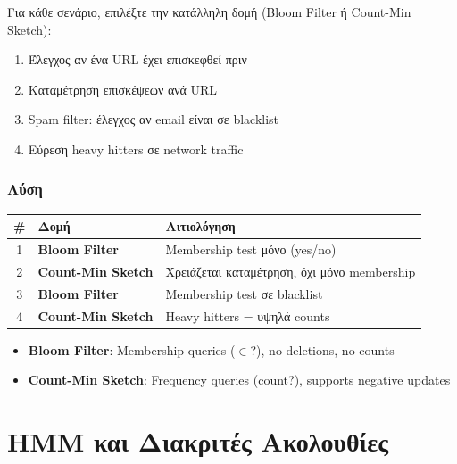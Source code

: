 \begin{formulabox}[Εκφώνηση]
Για κάθε σενάριο, επιλέξτε την κατάλληλη δομή (Bloom Filter ή Count-Min Sketch):

\begin{enumerate}
    \item Έλεγχος αν ένα URL έχει επισκεφθεί πριν
    \item Καταμέτρηση επισκέψεων ανά URL
    \item Spam filter: έλεγχος αν email είναι σε blacklist
    \item Εύρεση heavy hitters σε network traffic
\end{enumerate}
\end{formulabox}

\subsubsection*{Λύση}

\begin{center}
\begin{tabular}{clp{6cm}}
\toprule
\textbf{\#} & \textbf{Δομή} & \textbf{Αιτιολόγηση} \\
\midrule
1 & \textbf{Bloom Filter} & Membership test μόνο (yes/no) \\
2 & \textbf{Count-Min Sketch} & Χρειάζεται καταμέτρηση, όχι μόνο membership \\
3 & \textbf{Bloom Filter} & Membership test σε blacklist \\
4 & \textbf{Count-Min Sketch} & Heavy hitters = υψηλά counts \\
\bottomrule
\end{tabular}
\end{center}

\begin{infobox}[Σύγκριση]
\begin{itemize}
    \item \textbf{Bloom Filter}: Membership queries ($\in$?), no deletions, no counts
    \item \textbf{Count-Min Sketch}: Frequency queries (count?), supports negative updates
\end{itemize}
\end{infobox}


\section{HMM και Διακριτές Ακολουθίες}

